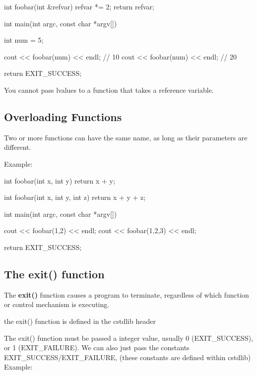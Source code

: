 \documentclass{report}
\begin{document}
    \begin{cppcode}
int foobar(int &refvar) { refvar *= 2; return refvar; }

int main(int argc, const char *argv[]) {
    
    int num = 5;

    cout << foobar(num) << endl;  // 10
    cout << foobar(num) << endl;  // 20

    return EXIT_SUCCESS;
}
    \end{cppcode}
    
    
    \bigbreak \noindent 
    \begin{notebox}
			You cannot pass lvalues to a function that takes a reference variable.
		\end{notebox}
    \bigbreak \noindent 

    \pagebreak
    \subsection{Overloading Functions}
    \bigbreak \noindent 
    \begin{concept}
 Two or more functions can have the same name, as long as their parameters are different.
	\end{concept}
    \bigbreak \noindent 
    Example:
    \bigbreak \noindent 
    
    \begin{cppcode}
int foobar(int x, int y) { return x + y; }

int foobar(int x, int y, int z) { return x + y + z; }

int main(int argc, const char *argv[]) {

    cout << foobar(1,2) << endl;
    cout << foobar(1,2,3) << endl;

    return EXIT_SUCCESS;
}
    \end{cppcode}
    

    \bigbreak \noindent \bigbreak \noindent 
    \subsection{The exit() function}
    \bigbreak \noindent 
    \begin{concept}

	\end{concept}
    \bigbreak \noindent 
    The \textbf{exit()} function causes a program to terminate, regardless of which function or control mechanism is executing.
    \bigbreak \noindent 
    \begin{notebox}
			the exit() function is defined in the cstdlib header
		\end{notebox}
    \bigbreak \noindent 
    The exit() function must be passed a integer value, usually 0 (EXIT\_SUCCESS), or 1 (EXIT\_FAILURE). We can also just pass the constants EXIT\_SUCCESS/EXIT\_FAILURE, (these constants are defined within cstdlib)
    Example:
    \bigbreak \noindent 
    
\end{document}

